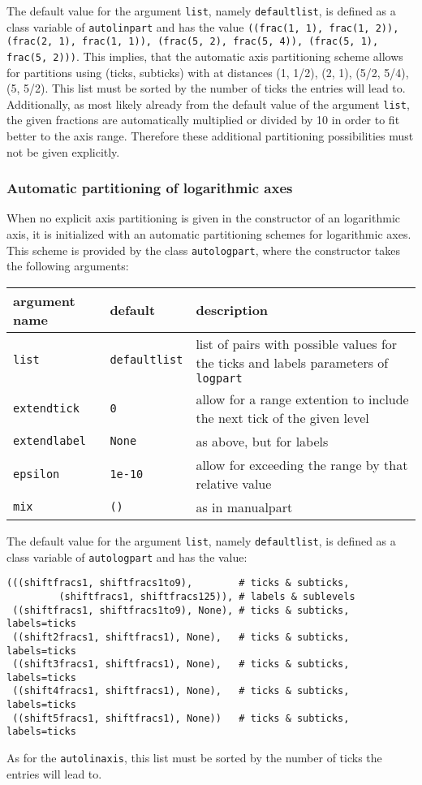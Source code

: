 The default value for the argument \verb|list|, namely
\verb|defaultlist|, is defined as a class variable of
\verb|autolinpart| and has the value \texttt{((frac(1, 1), frac(1,
2)), (frac(2, 1), frac(1, 1)), (frac(5, 2), frac(5, 4)), (frac(5, 1),
frac(5, 2)))}. This implies, that the automatic axis partitioning
scheme allows for partitions using (ticks, subticks) with at distances
(1, 1/2), (2, 1), (5/2, 5/4), (5, 5/2). This list must be sorted by
the number of ticks the entries will lead to. Additionally, as most
likely already from the default value of the argument \verb|list|, the
given fractions are automatically multiplied or divided by 10 in order
to fit better to the axis range. Therefore these additional
partitioning possibilities must not be given explicitly.

\subsubsection{Automatic partitioning of logarithmic axes}

When no explicit axis partitioning is given in the constructor of an
logarithmic axis, it is initialized with an automatic partitioning
schemes for logarithmic axes. This scheme is provided by the class
\verb|autologpart|, where the constructor takes the following
arguments:

\medskip
\begin{tabularx}{\linewidth}{ll>{\raggedright\arraybackslash}X}
argument name&default&description\\
\hline
\texttt{list}&\texttt{defaultlist}&list of pairs with possible values for the ticks and labels parameters of \texttt{logpart}\\
\texttt{extendtick}&\texttt{0}&allow for a range extention to include the next tick of the given level\\
\texttt{extendlabel}&\texttt{None}&as above, but for labels\\
\texttt{epsilon}&\texttt{1e-10}&allow for exceeding the range by that relative value\\
\texttt{mix}&\texttt{()}&as in manualpart\\
\end{tabularx}
\medskip

The default value for the argument \verb|list|, namely
\verb|defaultlist|, is defined as a class variable of
\verb|autologpart| and has the value:
\begin{verbatim}
(((shiftfracs1, shiftfracs1to9),        # ticks & subticks,
         (shiftfracs1, shiftfracs125)), # labels & sublevels
 ((shiftfracs1, shiftfracs1to9), None), # ticks & subticks, labels=ticks
 ((shift2fracs1, shiftfracs1), None),   # ticks & subticks, labels=ticks
 ((shift3fracs1, shiftfracs1), None),   # ticks & subticks, labels=ticks
 ((shift4fracs1, shiftfracs1), None),   # ticks & subticks, labels=ticks
 ((shift5fracs1, shiftfracs1), None))   # ticks & subticks, labels=ticks
\end{verbatim}
As for the \verb|autolinaxis|, this list must be sorted by the number
of ticks the entries will lead to.

